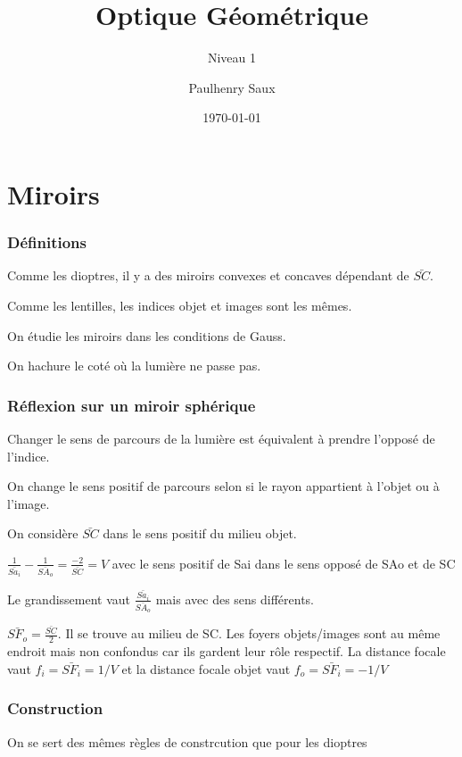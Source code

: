 \documentclass[french]{yLectureNote}
\title{Optique Géométrique}
\subtitle{Niveau 1}
\author{Paulhenry Saux}
\date{\today}
\begin{document}

\setcounter{chapter}{6}
\chapter{Miroirs}
\subsection{Définitions}
Comme les dioptres, il y a des miroirs convexes et concaves dépendant de \(\bar{SC}\).

Comme les lentilles, les indices objet et images sont les m\^emes.

On étudie les miroirs dans les conditions de Gauss.

On hachure le coté où la lumière ne passe pas.
\subsection{Réflexion sur un miroir sphérique}
Changer le sens de parcours de la lumière est équivalent à prendre l'opposé de l'indice.

On change le sens positif de parcours selon si le rayon appartient à l'objet ou à l'image.

On considère \(\bar{SC}\) dans le sens positif du milieu objet.

\begin{theorem}
 \(\frac{1}{\bar{Sa_i}} - \frac{1}{\bar{SA_o}} = \frac{-2}{\bar{SC}} = V\) avec le sens positif de Sai dans le sens opposé de SAo et de SC
\end{theorem}
Le grandissement vaut \(\frac{\bar{Sa_i}}{\bar{SA_o}}\) mais avec des sens différents.
\begin{theorem}
 \(\bar{SF_o} = \frac{\bar{SC}}{2}\). Il se trouve au milieu de SC. Les foyers objets/images sont au m\^eme endroit mais non confondus car ils gardent leur r\^ole respectif. La distance focale vaut \(f_i  = \bar{SF_i} = 1/V\) et la distance focale objet  vaut \(f_o  = \bar{SF_i} = -1/V\)
\end{theorem}
\subsection{Construction}
On se sert des m\^emes règles de constrcution que pour les dioptres
\end{document}
